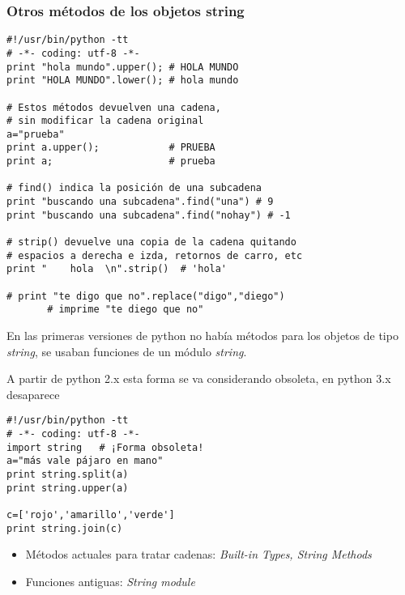 \documentclass[ucs]{beamer}
\begin{document}

\begin{frame}[fragile]
\frametitle{Otros métodos de los objetos string}

  \begin{scriptsize}
  \begin{verbatim}
#!/usr/bin/python -tt
# -*- coding: utf-8 -*-
print "hola mundo".upper(); # HOLA MUNDO 
print "HOLA MUNDO".lower(); # hola mundo 

# Estos métodos devuelven una cadena,
# sin modificar la cadena original
a="prueba"
print a.upper();            # PRUEBA
print a;                    # prueba

# find() indica la posición de una subcadena
print "buscando una subcadena".find("una") # 9
print "buscando una subcadena".find("nohay") # -1

# strip() devuelve una copia de la cadena quitando
# espacios a derecha e izda, retornos de carro, etc
print "    hola  \n".strip()  # 'hola'

# print "te digo que no".replace("digo","diego")
       # imprime "te diego que no"
  \end{verbatim}
  \end{scriptsize}

\end{frame}




\begin{frame}[fragile]
En las primeras versiones de python no había métodos para los objetos
de tipo \emph{string}, se usaban funciones de un módulo \emph{string}.

A partir de python 2.x esta forma se va considerando obsoleta, en
python 3.x desaparece
  \begin{scriptsize}
\begin{verbatim}
#!/usr/bin/python -tt
# -*- coding: utf-8 -*-
import string   # ¡Forma obsoleta!
a="más vale pájaro en mano"
print string.split(a)
print string.upper(a)

c=['rojo','amarillo','verde']
print string.join(c)
\end{verbatim}
  \end{scriptsize}

\begin{itemize}
\item
Métodos actuales para tratar cadenas:
\emph{Built-in Types, String Methods}
\item
Funciones antiguas:
\emph{String module}
\end{itemize}

\end{frame}
\end{document}
